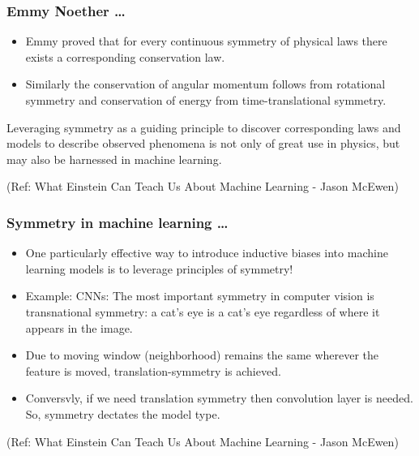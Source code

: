 \begin{frame}[fragile]\frametitle{Emmy Noether \ldots}


	\begin{itemize}
	\item Emmy proved that for every continuous symmetry of physical laws there exists a corresponding conservation law.
	\item Similarly the conservation of angular momentum follows from rotational symmetry and conservation of energy from time-translational symmetry.
	\end{itemize}

Leveraging symmetry as a guiding principle to discover corresponding laws and models to describe observed phenomena is not only of great use in physics, but may also be harnessed in machine learning.

{\tiny (Ref: What Einstein Can Teach Us About Machine Learning - Jason McEwen)}

\end{frame}

\begin{frame}[fragile]\frametitle{Symmetry in machine learning \ldots}


	\begin{itemize}
	\item One particularly effective way to introduce inductive biases into machine learning models  is to leverage principles of symmetry!
	\item Example: CNNs: The most important symmetry in computer vision is transnational symmetry: a cat’s eye is a cat’s eye regardless of where it appears in the image.
	\item Due to moving window (neighborhood) remains the same wherever the feature is moved, translation-symmetry is achieved.
	\item Conversvly, if we need translation symmetry then convolution layer is needed. So, symmetry dectates the model type.
	\end{itemize}


{\tiny (Ref: What Einstein Can Teach Us About Machine Learning - Jason McEwen)}

\end{frame}

